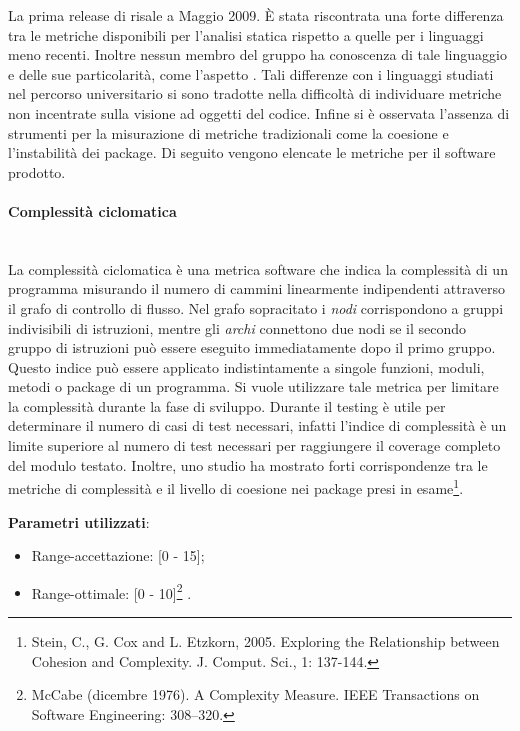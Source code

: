 		La prima release di  risale a Maggio 2009. È stata riscontrata una forte differenza tra le metriche disponibili per l'analisi statica rispetto a quelle per i linguaggi meno recenti. Inoltre nessun membro del gruppo ha conoscenza di tale linguaggio e delle sue particolarità, come l'aspetto . Tali differenze con i linguaggi studiati nel percorso universitario si sono tradotte nella difficoltà di individuare metriche non incentrate sulla visione ad oggetti del codice. Infine si è osservata l'assenza di strumenti per la misurazione di metriche tradizionali come la coesione e l'instabilità dei package.
		Di seguito vengono elencate le metriche per il software prodotto.
		
			\paragraph{Complessità ciclomatica}\mbox{} \\
				
			La complessità ciclomatica è una metrica software che indica la complessità di un programma misurando il numero di cammini linearmente indipendenti attraverso il grafo di controllo di flusso. Nel grafo sopracitato i \emph{nodi} corrispondono a gruppi indivisibili di istruzioni, mentre gli \emph{archi} connettono due nodi se il secondo gruppo di istruzioni può essere eseguito immediatamente dopo il primo gruppo.
			Questo indice può essere applicato indistintamente a singole funzioni, moduli, metodi o package di un programma.
			Si vuole utilizzare tale metrica per limitare la complessità durante la fase di sviluppo.
			Durante il testing è utile per determinare il numero di casi di test necessari, infatti l'indice di complessità è un limite superiore al numero di test necessari per raggiungere il coverage completo del modulo testato. Inoltre, uno studio ha mostrato forti corrispondenze tra le metriche di complessità e il livello di coesione nei package presi in esame\footnote{Stein, C., G. Cox and L. Etzkorn, 2005. Exploring the Relationship between Cohesion and Complexity. J. Comput. Sci., 1: 137-144.}.
			
			\textbf{Parametri utilizzati}:
			\begin{itemize}
				\item Range-accettazione: [0 - 15];
				\item Range-ottimale: [0 - 10]\footnote{McCabe (dicembre 1976). A Complexity Measure. IEEE Transactions on Software Engineering: 308–320.} .
			\end{itemize}

